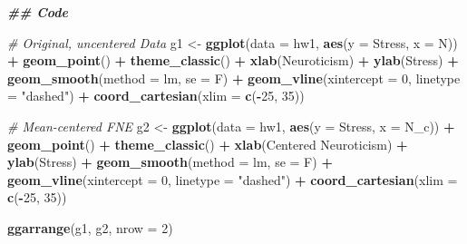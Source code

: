 \documentclass[
]{article}
\newenvironment{Shaded}{\begin{snugshade}}{\end{snugshade}}
\newcommand{\AttributeTok}[1]{\textcolor[rgb]{0.13,0.29,0.53}{#1}}
\newcommand{\CommentTok}[1]{\textcolor[rgb]{0.56,0.35,0.01}{\textit{#1}}}
\newcommand{\DecValTok}[1]{\textcolor[rgb]{0.00,0.00,0.81}{#1}}
\newcommand{\DocumentationTok}[1]{\textcolor[rgb]{0.56,0.35,0.01}{\textbf{\textit{#1}}}}
\newcommand{\FunctionTok}[1]{\textcolor[rgb]{0.13,0.29,0.53}{\textbf{#1}}}
\newcommand{\NormalTok}[1]{#1}
\newcommand{\OtherTok}[1]{\textcolor[rgb]{0.56,0.35,0.01}{#1}}
\newcommand{\SpecialCharTok}[1]{\textcolor[rgb]{0.81,0.36,0.00}{\textbf{#1}}}
\newcommand{\StringTok}[1]{\textcolor[rgb]{0.31,0.60,0.02}{#1}}
\begin{document}
\begin{Shaded}
\begin{Highlighting}[]
\DocumentationTok{\#\# Code}

\CommentTok{\# Original, uncentered Data}
\NormalTok{g1 }\OtherTok{\textless{}{-}} \FunctionTok{ggplot}\NormalTok{(}\AttributeTok{data =}\NormalTok{ hw1, }\FunctionTok{aes}\NormalTok{(}\AttributeTok{y =}\NormalTok{ Stress, }\AttributeTok{x =}\NormalTok{ N)) }\SpecialCharTok{+} 
  \FunctionTok{geom\_point}\NormalTok{() }\SpecialCharTok{+}
  \FunctionTok{theme\_classic}\NormalTok{() }\SpecialCharTok{+}
  \FunctionTok{xlab}\NormalTok{(}\StringTok{\textquotesingle{}Neuroticism\textquotesingle{}}\NormalTok{) }\SpecialCharTok{+}
  \FunctionTok{ylab}\NormalTok{(}\StringTok{\textquotesingle{}Stress\textquotesingle{}}\NormalTok{) }\SpecialCharTok{+}
  \FunctionTok{geom\_smooth}\NormalTok{(}\AttributeTok{method =} \StringTok{\textquotesingle{}lm\textquotesingle{}}\NormalTok{, }\AttributeTok{se =}\NormalTok{ F) }\SpecialCharTok{+}
  \FunctionTok{geom\_vline}\NormalTok{(}\AttributeTok{xintercept =} \DecValTok{0}\NormalTok{, }\AttributeTok{linetype =} \StringTok{"dashed"}\NormalTok{) }\SpecialCharTok{+}
  \FunctionTok{coord\_cartesian}\NormalTok{(}\AttributeTok{xlim =} \FunctionTok{c}\NormalTok{(}\SpecialCharTok{{-}}\DecValTok{25}\NormalTok{, }\DecValTok{35}\NormalTok{))}

\CommentTok{\# Mean{-}centered FNE}
\NormalTok{g2 }\OtherTok{\textless{}{-}} \FunctionTok{ggplot}\NormalTok{(}\AttributeTok{data =}\NormalTok{ hw1, }\FunctionTok{aes}\NormalTok{(}\AttributeTok{y =}\NormalTok{ Stress, }\AttributeTok{x =}\NormalTok{ N\_c)) }\SpecialCharTok{+}
  \FunctionTok{geom\_point}\NormalTok{() }\SpecialCharTok{+}
  \FunctionTok{theme\_classic}\NormalTok{() }\SpecialCharTok{+}
  \FunctionTok{xlab}\NormalTok{(}\StringTok{\textquotesingle{}Centered Neuroticism\textquotesingle{}}\NormalTok{) }\SpecialCharTok{+}
  \FunctionTok{ylab}\NormalTok{(}\StringTok{\textquotesingle{}Stress\textquotesingle{}}\NormalTok{) }\SpecialCharTok{+}
  \FunctionTok{geom\_smooth}\NormalTok{(}\AttributeTok{method =} \StringTok{\textquotesingle{}lm\textquotesingle{}}\NormalTok{, }\AttributeTok{se =}\NormalTok{ F) }\SpecialCharTok{+}
  \FunctionTok{geom\_vline}\NormalTok{(}\AttributeTok{xintercept =} \DecValTok{0}\NormalTok{, }\AttributeTok{linetype =} \StringTok{"dashed"}\NormalTok{) }\SpecialCharTok{+}
  \FunctionTok{coord\_cartesian}\NormalTok{(}\AttributeTok{xlim =} \FunctionTok{c}\NormalTok{(}\SpecialCharTok{{-}}\DecValTok{25}\NormalTok{, }\DecValTok{35}\NormalTok{))}
  
\FunctionTok{ggarrange}\NormalTok{(g1, g2, }\AttributeTok{nrow =} \DecValTok{2}\NormalTok{)}
\end{Highlighting}
\end{Shaded}
\end{document}

